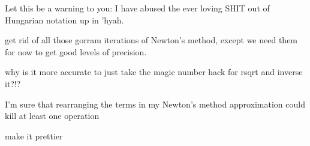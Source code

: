
\begin{DoxyRefList}
\item[\label{todo__todo000002}%
\hypertarget{todo__todo000002}{}%
Global \hyperlink{iutils_8c_ad9b6aaf19fdac7482cc5e8bbb77cb796}{ifast\-\_\-bigpow} (float base, float power)]Let this be a warning to you\-: I have abused the ever loving S\-H\-I\-T out of Hungarian notation up in 'hyah.  
\item[\label{todo__todo000003}%
\hypertarget{todo__todo000003}{}%
Global \hyperlink{iutils_8h_a99799aeb9cb7fb340a3cec124d429764}{ifast\-\_\-sqrt} (float x)]get rid of all those gorram iterations of Newton's method, except we need them for now to get good levels of precision. 

why is it more accurate to just take the magic number hack for rsqrt and inverse it?!? 

I'm sure that rearranging the terms in my Newton's method approximation could kill at least one operation  
\item[\label{todo__todo000001}%
\hypertarget{todo__todo000001}{}%
Global \hyperlink{icoordinates_8h_af824fb9002b49e7348de15d84229e536}{iprint\-\_\-vector} (struct \hyperlink{structivector__t}{ivector\-\_\-t} $\ast$restrict vec)]make it prettier 
\end{DoxyRefList}